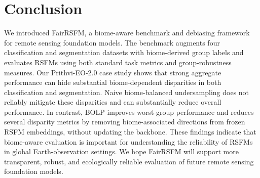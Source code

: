 \documentclass[10pt,twocolumn,letterpaper]{article}
\newcommand{\method}{FairRSFM\xspace}
\begin{document}
\section{Conclusion}

We introduced \method, a biome-aware benchmark and debiasing framework for remote sensing foundation models. The benchmark augments four classification and segmentation datasets with biome-derived group labels and evaluates RSFMs using both standard task metrics and group-robustness measures. Our Prithvi-EO-2.0 case study shows that strong aggregate performance can hide substantial biome-dependent disparities in both classification and segmentation. Naive biome-balanced undersampling does not reliably mitigate these disparities and can substantially reduce overall performance. In contrast, BOLP improves worst-group performance and reduces several disparity metrics by removing biome-associated directions from frozen RSFM embeddings, without updating the backbone. These findings indicate that biome-aware evaluation is important for understanding the reliability of RSFMs in global Earth-observation settings. We hope \method will support more transparent, robust, and ecologically reliable evaluation of future remote sensing foundation models.



\clearpage

{\small


}
\end{document}
